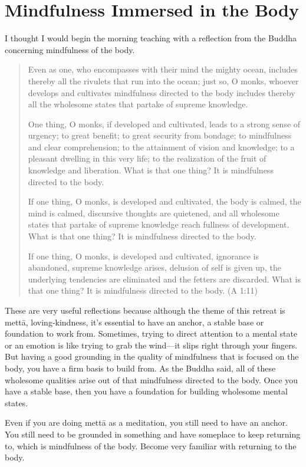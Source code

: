 \chapter{Mindfulness Immersed in the
Body}

I thought I would begin the morning teaching with a reflection from the
Buddha concerning mindfulness of the body.

\begin{quotation}
Even as one, who encompasses with their mind the mighty ocean, includes
thereby all the rivulets that run into the ocean; just so, O monks,
whoever develops and cultivates mindfulness directed to the body
includes thereby all the wholesome states that partake of supreme
knowledge.

One thing, O monks, if developed and cultivated, leads to a strong sense
of urgency; to great benefit; to great security from bondage; to
mindfulness and clear comprehension; to the attainment of vision and
knowledge; to a pleasant dwelling in this very life; to the realization
of the fruit of knowledge and liberation. What is that one thing? It is
mindfulness directed to the body.

If one thing, O monks, is developed and cultivated, the body is calmed,
the mind is calmed, discursive thoughts are quietened, and all wholesome
states that partake of supreme knowledge reach fullness of development.
What is that one thing? It is mindfulness directed to the body.

If one thing, O monks, is developed and cultivated, ignorance is
abandoned, supreme knowledge arises, delusion of self is given up, the
underlying tendencies are eliminated and the fetters are discarded. What
is that one thing? It is mindfulness directed to the body. (A 1:11)
\end{quotation}

These are very useful reflections because although the theme of this
retreat is mettā, loving-kindness, it’s essential to have an anchor, a
stable base or foundation to work from. Sometimes, trying to direct
attention to a mental state or an emotion is like trying to grab the
wind—it slips right through your fingers. But having a good grounding in
the quality of mindfulness that is focused on the body, you have a firm
basis to build from. As the Buddha said, all of these wholesome
qualities arise out of that mindfulness directed to the body. Once you
have a stable base, then you have a foundation for building wholesome
mental states.

Even if you are doing mettā as a meditation, you still need to have an
anchor. You still need to be grounded in something and have someplace to
keep returning to, which is mindfulness of the body. Become very
familiar with returning to the body.


